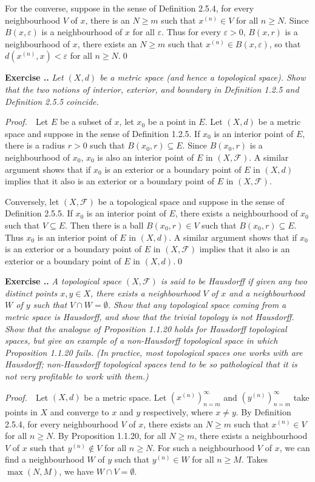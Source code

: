 \documentclass{book}
\newcommand{\pff}{\vspace{.25em}\noindent\emph{Proof.}~~}
\newcounter{Exercise}[section]
\renewcommand{\theExercise}{\thesection.\arabic{Exercise}.}
\newcommand{\new}{\vspace{1.5em}\noindent\textbf{Exercise \stepcounter{Exercise}\textbf{\theExercise}} }
\begin{document}
For the converse, suppose in the sense of Definition 2.5.4, for every neighbourhood $V$ of $x$, there is an $N\geq m$ such that $x^{(n)}\in V$ for all $n\geq N$. Since $B(x,\varepsilon)$ is a neighbourhood of $x$ for all $\varepsilon$. Thus for every $\varepsilon>0$, $B(x,r)$ is a neighbourhood of $x$, there exists an $N\geq m$ such that $x^{(n)}\in B(x,\varepsilon)$, so that $d(x^{(n)},x)<\varepsilon$ for all $n\geq N$.\qed

\new\emph{Let $(X,d)$ be a metric space (and hence a topological space). Show that the two notions of interior, exterior, and boundary in Definition 1.2.5 and Definition 2.5.5 coincide.}

\pff Let $E$ be a subset of $x$, let $x_0$ be a point in $E$. Let $(X,d)$ be a metric space and suppose in the sense of Definition 1.2.5. If $x_0$ is an interior point of $E$, there is a radius $r>0$ such that $B(x_0,r)\subseteq E$. Since $B(x_0,r)$ is a neighbourhood of $x_0$, $x_0$ is also an interior point of $E$ in $(X,\mathcal{F})$. A similar argument shows that if $x_0$ is an exterior or a boundary point of $E$ in $(X,d)$ implies that it also is an exterior or a boundary point of $E$ in $(X,\mathcal{F})$.

Conversely, let $(X,\mathcal{F})$ be a topological space and suppose in the sense of Definition 2.5.5. If $x_0$ is an interior point of $E$, there exists a neighbourhood of $x_0$ such that $V\subseteq E$. Then there is a ball $B(x_0,r)\in V$ such that $B(x_0,r)\subseteq E$. Thus $x_0$ is an interior point of $E$ in $(X,d)$. A similar argument shows that if $x_0$ is an exterior or a boundary point of $E$ in $(X,\mathcal{F})$ implies that it also is an exterior or a boundary point of $E$ in $(X,d)$.\qed

\new\emph{A topological space $(X,\mathcal{F})$ is said to be \textnormal{Hausdorff} if given any two distinct points $x,y\in X$, there exists a neighbourhood $V$ of $x$ and a neighbourhood $W$ of $y$ such that $V\cap W=\emptyset$. Show that any topological space coming from a metric space is Hausdorff, and show that the trivial topology is not Hausdorff. Show that the analogue of Proposition 1.1.20 holds for Hausdorff topological spaces, but give an example of a non-Hausdorff topological space in which Proposition 1.1.20 fails. (In practice, most topological spaces one works with are Hausdorff; non-Hausdorff topological spaces tend to be so pathological that it is not very profitable to work with them.)}

\pff Let $(X,d)$ be a metric space. Let $(x^{(n)})_{n=m}^{\infty}$ and $(y^{(n)})_{n=m}^{\infty}$ take points in $X$ and converge to $x$ and $y$ respectively, where $x\neq y$. By Definition 2.5.4, for every neighbourhood $V$ of $x$, there exists an $N\geq m$ such that $x^{(n)}\in V$ for all $n\geq N$. By Proposition 1.1.20, for all $N\geq m$, there exists a neighbourhood $V$ of $x$ such that $y^{(n)}\notin V$ for all $n\geq N$. For such a neighbourhood $V$ of $x$, we can find a neighbourhood $W$ of $y$ such that $y^{(n)}\in W$ for all $n\geq M$. Takes $\max(N,M)$, we have $W\cap V=\emptyset$.
\end{document}
